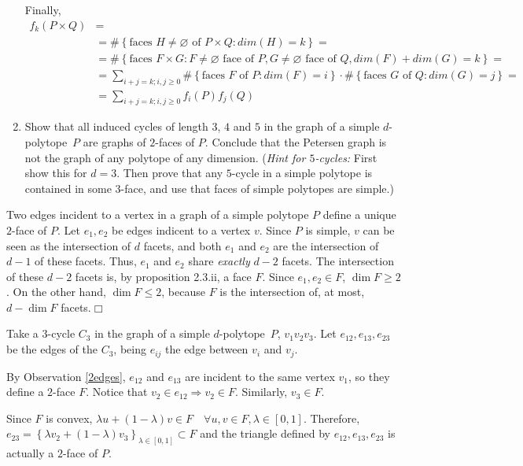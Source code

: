 \documentclass[11pt]{amsart}
\theoremstyle{definition}
\begin{document}
\begin{enumerate}
Finally,
\begin{align*}
  f_k(P\times Q)&=\\
  &=\#\left\{\text{faces } H\neq\varnothing  \text{ of }P\times Q: dim(H)=k\right\}=\\
  &=\#\left\{\text{faces } F\times G:F\neq\varnothing  \text{ face of }P, G\neq\varnothing \text{ face of }Q, dim(F)+dim(G)=k\right\}=\\
  &=\sum_{i+j=k; i,j\geq 0} \#\left\{\text{faces } F \text{ of } P : dim(F)=i\right\}
  \cdot\#\left\{\text{faces } G \text{ of } Q : dim(G)=j\right\}=\\  
  &=\sum_{i+j=k; i,j\geq 0} f_i(P)f_j(Q)
\end{align*}

\item Show that all induced cycles of length $3$, $4$ and $5$ in the graph of a simple $d$-polytope~$P$ are graphs of $2$-faces of $P$.
Conclude that the Petersen graph is not the graph of any polytope of any dimension. (\emph{Hint for $5$-cycles:} First show this for $d=3$. Then prove
that any $5$-cycle in a simple polytope is contained in some $3$-face,
and use that faces of  simple polytopes are simple.)
\end{enumerate}


\obs\label{2edges} Two edges incident to a vertex in a graph of a simple polytope $P$ define a unique $2$-face of $P$.
\proof Let $e_1, e_2$ be edges indicent to a vertex $v$. Since $P$ is simple, $v$ can be seen as the intersection of $d$ facets, and both $e_1$ and $e_2$ are the intersection of $d-1$ of these facets. Thus, $e_1$ and $e_2$ share \emph{exactly} $d-2$ facets. 
The intersection of these $d-2$ facets is, by proposition 2.3.ii, a face $F$. Since $e_1,e_2\in F$, $\dim F \geq 2$. On the other hand, $\dim F \leq 2$, because $F$ is the intersection of, at most, $d-\dim F$ facets.$\Box$
\bigskip

Take a $3$-cycle $C_3$ in the graph of a simple $d$-polytope~$P$, $v_1v_2v_3$. Let $e_{12},e_{13},e_{23}$ be the edges of the $C_3$, being $e_{ij}$ the edge between $v_i$ and $v_j$.

By Observation \ref{2edges}, $e_{12}$ and $e_{13}$ are incident to the same vertex $v_1$, so they define a $2$-face $F$. Notice that $v_2\in e_{12}\Rightarrow v_2\in F$. Similarly, $v_3\in F$.

Since $F$ is convex, $\lambda u + (1-\lambda) v \in F \quad\forall u,v\in F, \lambda \in [0,1]$. Therefore, $e_{23}=\left\{\lambda v_2 + (1-\lambda) v_3\right\}_{\lambda\in[0,1]}\subset F$ and the triangle defined by $e_{12},e_{13},e_{23}$ is actually a $2$-face of $P$.
\bigskip
\end{document}
